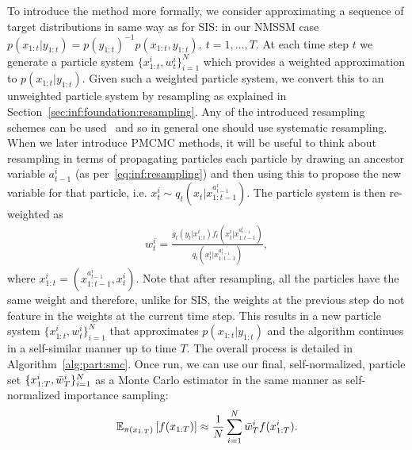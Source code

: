 To introduce the \smc method more formally, we consider approximating a sequence of target distributions
in same way as for SIS: in our NMSSM
 case $p(x_{1:t}|y_{1:t}) = p(y_{1:t})^{-1} p(x_{1:t},y_{1:t}), ~t=1,\ldots,T$. 
At each time step $t$ we 
generate a particle system
$\{x_{1:t}^i,w_{t}^i\}_{i=1}^N$ which provides a weighted approximation  to $p(x_{1:t}|y_{1:t})$. Given such a 
weighted particle system, we convert this to an unweighted particle system by resampling as explained
in Section~\ref{sec:inf:foundation:resampling}.  Any of the introduced resampling schemes can be 
used~\citep[Section 4.1]{andrieu2010particle}
and so in general one should use systematic resampling.
When we later introduce PMCMC methods, it will
be useful to think about resampling in terms of propagating particles each particle by drawing an 
ancestor variable $a_{t-1}^i$ (as per~\eqref{eq:inf:resampling}) and then using this to propose the new
variable for that particle, i.e. $x_t^i \sim q_t(x_t | x_{1:t-1}^{a_{t-1}^i})$.  The particle system is then
re-weighted as
\begin{align}
\label{eq:part:smcweights}
w_t^i = \frac{g_t(y_t|x_{1:t}^i) f_t(x_t^i | x_{1:t-1}^{a_{t-1}^i})}{q_t(x_t^i|x_{1:t-1}^{a_{t-1}^i})},
\end{align}
where $x_{1:t}^i = (x_{1:t-1}^{a_{t-1}^i},x_t^i)$.   Note that after resampling,
all the particles have the same weight and therefore, unlike for SIS, the weights at the previous step
do not feature in the weights at the current time step.
This results in a new particle system $\{x_{1:t}^i,w_t^i\}_{i=1}^N$ that approximates $p(x_{1:t}|y_{1:t})$
and the algorithm continues in a self-similar manner up to time $T$.
The overall process is detailed in Algorithm~\ref{alg:part:smc}.  Once run, we can use our final, self-normalized,
particle set $\{x_{1:T}^i,\bar w_T^i\}_{i=1}^N$ as a Monte Carlo estimator in the same manner as self-normalized
importance sampling:
\begin{align}
\label{eq:part:smc-est}
\mathbb{E}_{\pi (x_{1:T})} \left[f(x_{1:T})\right] \approx \frac{1}{N} \sum_{i=1}^{N} \bar w_T^i f(x_{1:T}^i).
\end{align}


